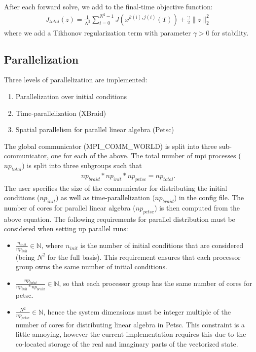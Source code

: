 \documentclass[letterpaper]{article}
\begin{document}
    After each forward solve, we add to the final-time objective function:
    \begin{align}
      J_{total}(z) = \frac{1}{N^2} \sum_{i=0}^{N^2-1} J\left(x^{k(i), j(i)}(T)\right) + \frac{\gamma}{2} \| z\|^2_2
    \end{align}
    where we add a Tikhonov regularization term with parameter $\gamma>0$ for stability.


  \subsection{Parallelization}
    Three levels of parallelization are implemented: 
      \begin{enumerate}
        \item Parallelization over initial conditions
        \item Time-parallelization (XBraid)
        \item Spatial parallelism for parallel linear algebra (Petsc)
      \end{enumerate}
      The global communicator (MPI\_COMM\_WORLD) is split into three sub-communicator, one for each of the above. The total number of mpi processes ($np_{total}$) is split into three subgroups such that 
         \begin{align*}
           np_{braid} * np_{init} * np_{petsc} = np_{total}.
         \end{align*}
      The user specifies the size of the communicator for distributing the initial conditions ($np_{init}$) as well as time-parallelization ($np_{braid}$) in the config file. The number of cores for parallel linear algebra ($np_{petsc}$) is then computed from the above equation. The following requirements for parallel distribution must be considered when setting up parallel runs:
      \begin{itemize}
        \item $\frac{n_{init}}{np_{init}} \in \mathds{N}$, where $n_{init}$ is the number of initial conditions that are considered (being $N^2$ for the full basis). This requirement ensures that each processor group owns the same number of initial conditions.
        \item $\frac{np_{total}}{np_{init}*np_{braid}} \in \mathds{N}$, so that each processor group has the same number of cores for petsc.
        \item $\frac{N^2}{np_{petsc}} \in \mathds{N}$, hence the system dimensions must be integer multiple of the number of cores for distributing linear algebra in Petsc. This constraint is a little annoying, however the current implementation requires this due to the co-located storage of the real and imaginary parts of the vectorized state.
      \end{itemize}
  
\end{document}
